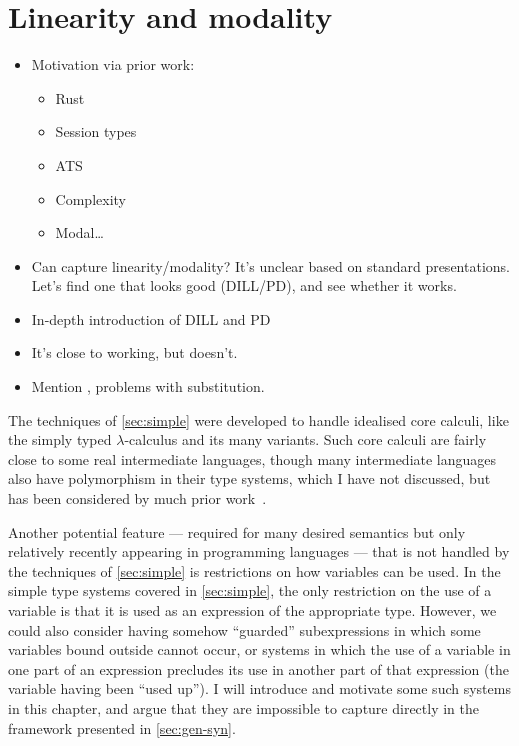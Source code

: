 \chapter{Linearity and modality}\label{sec:linearity}

\begin{itemize}
  \item Motivation via prior work:
    \begin{itemize}
      \item Rust
      \item Session types
      \item ATS
      \item Complexity \citep{Hofmann03}
      \item Modal\ldots
    \end{itemize}
  \item Can \citet{AACMM21} capture linearity/modality?
    It's unclear based on standard presentations.
    Let's find one that looks good (DILL/PD), and see whether it works.
  \item In-depth introduction of DILL and PD
  \item It's close to working, but doesn't.
  \item Mention \citet{BBdePH93}, problems with substitution.
\end{itemize}

The techniques of \cref{sec:simple} were developed to handle idealised core
calculi, like the simply typed $\lambda$-calculus and its many variants.
Such core calculi are fairly close to some real intermediate languages,
 though many intermediate languages also have polymorphism in their
type systems, which I have not discussed, but has been considered by much prior
work~\citep{POPLmark}.

Another potential feature --- required for many desired semantics but only
relatively recently appearing in programming languages --- that is not handled
by the techniques of \cref{sec:simple} is restrictions on how variables can be
used.
In the simple type systems covered in \cref{sec:simple}, the only restriction on
the use of a variable is that it is used as an expression of the appropriate
type.
However, we could also consider having somehow ``guarded'' subexpressions in
which some variables bound outside cannot occur, or systems in which the use of
a variable in one part of an expression precludes its use in another part of
that expression (the variable having been ``used up'').
I will introduce and motivate some such systems in this chapter, and argue that
they are impossible to capture directly in the framework presented in
\cref{sec:gen-syn}.

